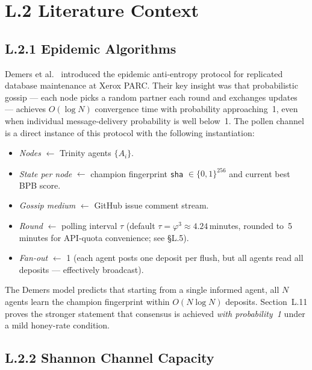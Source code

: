 \section*{L.2 \quad Literature Context}
\label{sec:appl-lit}

\subsection*{L.2.1 \quad Epidemic Algorithms}

Demers et al.~\cite{demers1987epidemic} introduced the epidemic
anti-entropy protocol for replicated database maintenance at Xerox
PARC.  Their key insight was that probabilistic gossip — each node
picks a random partner each round and exchanges updates — achieves
$O(\log N)$ convergence time with probability approaching~1, even
when individual message-delivery probability is well below~1.  The
pollen channel is a direct instance of this protocol with the
following instantiation:

\begin{itemize}
\item \emph{Nodes} $\leftarrow$ Trinity agents $\{A_i\}$.
\item \emph{State per node} $\leftarrow$ champion fingerprint
  \texttt{sha} $\in \{0,1\}^{256}$ and current best BPB score.
\item \emph{Gossip medium} $\leftarrow$ GitHub issue comment stream.
\item \emph{Round} $\leftarrow$ polling interval $\tau$ (default
  $\tau = \varphi^{3} \approx 4.24$\,minutes, rounded to~5\,minutes
  for API-quota convenience; see §L.5).
\item \emph{Fan-out} $\leftarrow$ 1 (each agent posts one deposit per
  flush, but all agents read all deposits — effectively broadcast).
\end{itemize}

The Demers model predicts that starting from a single informed agent,
all $N$ agents learn the champion fingerprint within
$O(N \log N)$ deposits.  Section~L.11 proves the stronger statement
that consensus is achieved \emph{with probability~1} under a mild
honey-rate condition.

\subsection*{L.2.2 \quad Shannon Channel Capacity}


